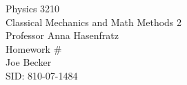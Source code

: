 \begin{titlepage}
\setlength{\topmargin}{1.5in}
\begin{center}
\Huge{Physics 3210} \\
\LARGE{Classical Mechanics and Math Methods 2} \\
\Large{Professor Anna Hasenfratz} \\[1cm]

\huge{Homework \#\HWnum}\\[0.5cm]

\large{Joe Becker} \\
\large{SID: 810-07-1484} \\
\large{\due} 

\end{center}

\end{titlepage}

